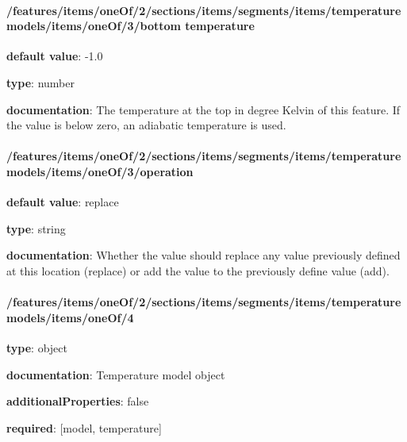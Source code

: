 \begin{itemized}
\end{itemized}\paragraph{/features/items/oneOf/2/sections/items/segments/items/temperature models/items/oneOf/3/bottom temperature} \begin{itemized}
\item {\bf default value}: -1.0
\item {\bf type}: number
\item {\bf documentation}: The temperature at the top in degree Kelvin of this feature. If the value is below zero, an adiabatic temperature is used.
\end{itemized}\paragraph{/features/items/oneOf/2/sections/items/segments/items/temperature models/items/oneOf/3/operation} \begin{itemized}
\item {\bf default value}: replace
\item {\bf type}: string
\item {\bf documentation}: Whether the value should replace any value previously defined at this location (replace) or add the value to the previously define value (add).
\end{itemized}\paragraph{/features/items/oneOf/2/sections/items/segments/items/temperature models/items/oneOf/4} \begin{itemized}
\item {\bf type}: object
\item {\bf documentation}: Temperature model object
\item {\bf additionalProperties}: false
\item {\bf required}: [model, temperature]\end{itemized}
